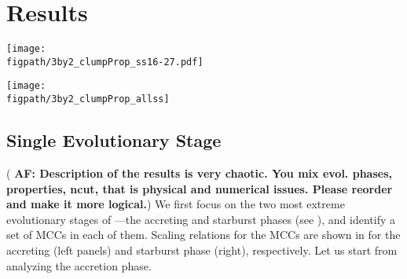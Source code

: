 \IfFileExists{emulateapjlegacy.cls}{\documentclass[iop]{emulateapjlegacy}}{\documentclass[iop]{emulateapj}}
\newcommand{\AF}[1]{({\bf \color{afcolor} AF: #1})}
\newcommand{\MM}[1]{({\bf \color{mmcolor} MM: #1})}
\def\figpath{./Fig}
\begin{document}
\section{Results}\label{sec:results}

\begin{figure*}
\centering
\texttt{[image: \\figpath/3by2\_clumpProp\_ss16-27.pdf]}
\caption{
Linewidth-size relation (top), $\alpha_{\rm vir}$-mass relation
(middle), and $\sigma^2/R$-$\Sigma_{\rm gas}$ relation (bottom) for
MCCs (star symbols) identified in the two most extreme evolutionary
stages of \flower\ ---accreting phase (left) and starburst phase
(right). Star symbols are color-coded by the density thresholds
$n_{\rm cut}$.  \MM{Give the color coding somewhere.} 
Data points in the $\alpha_{\rm vir}$-mass figure are taken from
\citet{Kauffmann17a} and \citet{Kauffmann17b} and references therein
(see Fig 4 of \citealt{Kauffmann17b}).   \MM{For consistency with
  Figure 1, label as ``Accreting'' rather than ``Accretion'' phase. I
  am inclined to leave the pressure confinement curves off of the
  final plot.}
\label{fig:larsons_single}}
\end{figure*}

\begin{figure*}
\centering
\texttt{[image: \\figpath/3by2\_clumpProp\_allss]}
\caption{Same as , except star symbols are showing MCCs identified across all evolutionary stages traced in our simulation, which are color-coded by the SFR of \flower in those stages. Left panels show MCCs identified using a low $n_{\rm cut}$\,\cc and right panels show MCCs identified using a high $n_{\rm cut}$\,\cc.
\label{fig:alpha16-28}}
\end{figure*}

\subsection{Single Evolutionary Stage}  \label{sec:singless}
\AF{Description of the results is very chaotic. You mix evol. phases, properties, ncut, that is physical and numerical issues. Please reorder and make it more logical.}
We first focus on the two most extreme evolutionary stages of \flower---the accreting and starburst phases (see ), and identify a set of MCCs in each of them. Scaling relations for the MCCs are shown in  for the accreting (left panels) and starburst phase (right), respectively. Let us start from analyzing the accretion phase.
\end{document}
